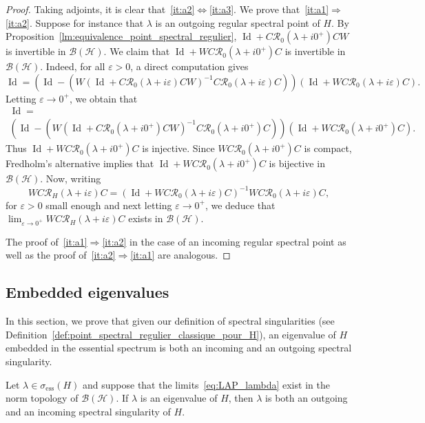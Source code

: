\documentclass[AHL,Unicode,longabstracts,published]{cedram}
\newcommand{\Hi}{\mathcal{H}}
\newcommand{\ess}{\mathrm{ess}}
\newcommand{\Res}{\mathcal{R}}
\newcommand{\clB}{\mathcal{B}}
\DeclareMathOperator{\Id}{Id}
\newcommand{\Hi}{\mathcal{H}}
\newcommand{\ess}{\mathrm{ess}}
\begin{document}
\begin{proof}
Taking adjoints, it is clear that~\eqref{it:a2}$\Leftrightarrow$\eqref{it:a3}. We prove that~\eqref{it:a1}$\Rightarrow$\eqref{it:a2}. Suppose for instance that $\lambda$ is an outgoing regular spectral point of $H$. By Proposition~\ref{lm:equivalence_point_spectral_regulier}, $\Id+C\Res_0(\lambda+ i0^+)CW$ is invertible in $\clB(\Hi)$. We claim that $\Id+WC\Res_0(\lambda+ i0^+)C$ is invertible in $\clB(\Hi)$. Indeed, for all $\varepsilon>0$, a direct computation gives
\begin{equation*}
\Id=\left(\Id-(W(\Id+C\Res_0(\lambda+ i\varepsilon)CW)^{-1}C\Res_0(\lambda+i\varepsilon)C)\right)\left(\Id+WC\Res_0(\lambda+ i\varepsilon)C\right).
\end{equation*}
Letting $\varepsilon\to0^+$, we obtain that
\begin{multline*}
\Id=\\
\left(\Id-(W(\Id+C\Res_0(\lambda+ i0^+)CW)^{-1}C\Res_0(\lambda+i0^+)C)\right)\left(\Id+WC\Res_0(\lambda+ i0^+)C\right).
\end{multline*}
Thus $\Id+WC\Res_0(\lambda+ i0^+)C$ is injective. Since $WC\Res_0(\lambda+ i0^+)C$ is compact, Fredholm's alternative implies that $\Id+WC\Res_0(\lambda+ i0^+)C$ is bijective in $\clB(\Hi)$. Now, writing
\begin{equation*}
WC\Res_H(\lambda+i\varepsilon)C=(\Id+WC\Res_0
(\lambda+i\varepsilon)C)^{-1}WC\Res_0(\lambda+i\varepsilon)C,
\end{equation*}
for $\varepsilon>0$ small enough and next letting $\varepsilon\to0^+$, we deduce that $\lim_{\varepsilon\rightarrow 0^+} WC\Res_H(\lambda+ i\varepsilon)C$ exists in $\clB(\Hi)$.

The proof of~\eqref{it:a1}$\Rightarrow$\eqref{it:a2} in the case of an incoming regular spectral point as well as the proof of~\eqref{it:a2}$\Rightarrow$\eqref{it:a1} are analogous.
\end{proof}


\subsection{Embedded eigenvalues}\label{sec:embed}

In this section, we prove that given our definition of spectral singularities (see Definition~\ref{def:point_spectral_regulier_classique_pour_H}), an eigenvalue of $H$ embedded in the essential spectrum is both an incoming and an outgoing spectral singularity.

\begin{prop}\label{cor:embed}
Let $\lambda\in \sigma_\ess(H)$ and suppose that the limits~\eqref{eq:LAP_lambda} exist in the norm topology of $\clB(\Hi)$. If $\lambda$ is an eigenvalue of $H$, then $\lambda$ is both an outgoing and an incoming spectral singularity of $H$.
\end{prop}
\end{document}
